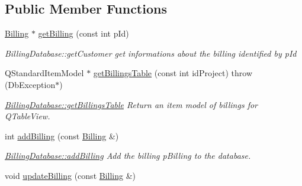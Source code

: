 \subsection*{Public Member Functions}
\begin{DoxyCompactItemize}
\item 
\hyperlink{classBilling}{Billing} $\ast$ \hyperlink{classBillingDatabase_a05b293f49756884e59d1509b76cc827a}{get\+Billing} (const int p\+Id)
\begin{DoxyCompactList}\small\item\em Billing\+Database\+::get\+Customer get informations about the billing identified by {\itshape p\+Id} \end{DoxyCompactList}\item 
Q\+Standard\+Item\+Model $\ast$ \hyperlink{classBillingDatabase_aec74e952e83d47332a5e07109588faa9}{get\+Billings\+Table} (const int id\+Project)  throw (\+Db\+Exception$\ast$)
\begin{DoxyCompactList}\small\item\em \hyperlink{classBillingDatabase_aec74e952e83d47332a5e07109588faa9}{Billing\+Database\+::get\+Billings\+Table} Return an item model of billings for Q\+Table\+View. \end{DoxyCompactList}\item 
int \hyperlink{classBillingDatabase_aff1663dc16fd98f373e7ecc8e2033114}{add\+Billing} (const \hyperlink{classBilling}{Billing} \&)
\begin{DoxyCompactList}\small\item\em \hyperlink{classBillingDatabase_aff1663dc16fd98f373e7ecc8e2033114}{Billing\+Database\+::add\+Billing} Add the billing {\itshape p\+Billing} to the database. \end{DoxyCompactList}\item 
\hypertarget{classBillingDatabase_a052aea6be4d10a372281f61f2583556a}{void \hyperlink{classBillingDatabase_a052aea6be4d10a372281f61f2583556a}{update\+Billing} (const \hyperlink{classBilling}{Billing} \&)}\label{classBillingDatabase_a052aea6be4d10a372281f61f2583556a}


\end{DoxyCompactItemize}
